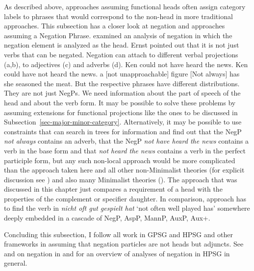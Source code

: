 \largerpage
As described above, approaches assuming functional heads often assign category labels to phrases
that would correspond to the non-head in more traditional approaches. This subsection has a
closer look at negation and approaches assuming a Negation Phrase. \citet{Ernst92a} examined an analysis of
negation in which the negation element is analyzed as the head. Ernst pointed out that it is
not just verbs that can be negated. Negation can attach to different verbal projections (a,b), to adjectives (c)
and adverbs (d).
\eal
\ex Ken could not have heard the news.
\ex Ken could have not heard the news.
\ex a [not unapproachable] figure
\ex {}[Not always] has she seasoned the meat.
\zl
But the respective phrases have different distributions. They are not just NegPs. We need
information about the part of speech of the head and about the verb form. It may be possible to
solve these problems by assuming extensions for functional projections like the ones to be discussed in
Subsection~\ref{sec-major-minor-category}. Alternatively, it may be possible to use constraints that
can search in trees for information and find out that the NegP \emph{not always} contains an adverb,
that the NegP \emph{not have heard the news} contains a verb in the base form and that \emph{not
  heard the news} contains a verb in the perfect participle form, but any such non-local approach
would be more complicated than the approach taken here and all other non-Minimalist theories (for
explicit discussion see \citealt{Sag2007a}) and also many Minimalist theories (\eg \citealt[]{Abraham2005a}). The approach that was discussed in this chapter just compares a requirement
  of a head with the properties of the complement or specifier daughter. In comparison, 
  approach has to find the verb in \emph{nicht oft gut gespielt hat} `not often well played has'
  somewhere deeply embedded in a cascade of NegP, AspP, MannP, AuxP, Aux+. 

Concluding this subsection, I follow all work in GPSG and HPSG and other frameworks in assuming that
negation particles are not heads but adjuncts. See  and  on negation in  and
 for an overview of analyses of negation in HPSG in general.

